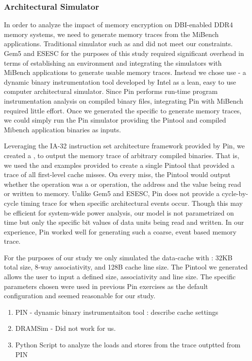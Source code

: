 \subsubsection{Architectural Simulator}
In order to analyze the impact of memory encryption on DBI-enabled DDR4 memory
systems, we need to generate memory traces from the MiBench applications.
Traditional simulator such as  \cite{gem5} and  \cite{esesc}
did not meet our constraints. Gem5 and ESESC for the purposes of this study
required significant overhead in terms of establishing an environment and
integrating the simulators with MiBench applications to generate usable memory
traces. Instead we chose use  \cite{pin} - a dynamic binary
instrumentation tool developed by Intel as a lean, easy to use computer
architectural simulator. Since Pin performs run-time program instrumentation
analysis on compiled binary files, integrating Pin with MiBench required little
effort. Once we generated the specific  to generate memory traces,
we could simply run the Pin simulator providing the Pintool and compiled
Mibench application binaries as inputs.

Leveraging the IA-32 instruction set architecture framework provided by Pin, we
created a , to output the memory trace of arbitrary compiled
binaries. That is, we used the  and  examples provided
to create a single Pintool that provided a trace of all first-level cache
misses. On every miss, the Pintool would output whether the operation was a
 or  operation, the address and the value being read or
written to memory. Unlike Gem5 and ESESC, Pin does not provide a cycle-by-cycle
timing trace for when specific architectural events occur. Though this may be
efficient for system-wide power analysis, our model is not parametrized on time
but only the specific bit values of data units being read and written. In our
experience, Pin worked well for generating such a coarse, event based memory
trace.

For the purposes of our study we only simulated the data-cache with : 32KB
total size, 8-way associativity, and 128B cache line size. The Pintool we
generated allows the user to input a defined size, associativity and line size.
The specific parameters chosen were used in previous Pin exercises as the
default configuration and seemed reasonable for our study.

\begin{enumerate}
  \item PIN - dynamic binary instrumentaiton tool : describe cache settings
  \item DRAMSim - Did not work for us.
  \item Python Script to analyze the loads and stores from the trace outptted
    from PIN
\end{enumerate}
